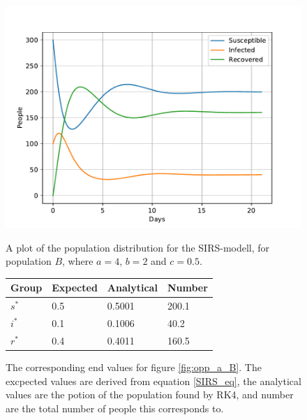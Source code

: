 \documentclass[a4paper]{article}
\begin{document}
\begin{figure}
	\centering
	\begin{minipage}{0.49\textwidth}
		\centering
		\includegraphics[scale=0.6]{../plots/opp_a_B.pdf}
		\caption{A plot of the population distribution for the SIRS-modell, for population $B$, where $a=4$, $b=2$ and $c=0.5$. }\label{fig:opp_a_B}
	\end{minipage}
	\begin{minipage}{0.49\textwidth}
		\centering
		\captionsetup{type=table} %
		\begin{tabular}{|l|l|l|l|}
			\hline
			Group & Expected & Analytical   & Number  \\ \hline
			$s^*$ & 0.5 & 0.5001 & 200.1 \\ \hline
			$i^*$ & 0.1 & 0.1006 & 40.2 \\ \hline
			$r^*$ & 0.4 & 0.4011 & 160.5 \\ \hline
		\end{tabular}
		\caption{The corresponding end values for figure \ref{fig:opp_a_B}. The excpected values are derived from equation \ref{SIRS_eq}, the analytical values are the potion of the population found by RK4, and number are the total number  of people this corresponds to.}\label{tab:opp_a_B}
	\end{minipage}
\end{figure}
\end{document}
